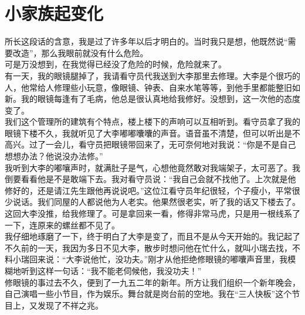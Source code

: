 \fancyhead[RO]{} %
\fancyhead[LE]{} %
\chapter*{小家族起变化}
\thispagestyle{empty}
所长这段话的含意，我是过了许多年以后才明白的。当时我只是想，他既然说“需要改造”，那么我眼前就没有什么危险。\\

可是万没想到，在我觉得已经没了危险的时候，危险就来了。\\

有一天，我的眼镜腿掉了，我请看守员代我送到大李那里去修理。大李是个很巧的人，他常给人修理些小玩意，像眼镜、钟表、自来水笔等等，到他手里都能整旧如新。我的眼镜每逢有了毛病，他总是很认真地给我修好。没想到，这一次他的态度变了。\\

我们这个管理所的建筑有个特点，楼上楼下的声响可以互相听到。看守员拿了我的眼镜下楼不久，我就听见了大李嘟嘟囔囔的声音。语音虽不清楚，但可以听出是不高兴。过了一会儿，看守员把眼镜带回来了，无可奈何地对我说：“你是不是自己想想办法？他说没办法修。”\\

我听到大李的嘟嚷声时，就满肚子是气，心想他竟然敢对我端架子，太可恶了。我倒要看看他是不是敢端下去。我对看守员说：“我自己会就不找他了。上次就是他修好的，还是请江先生跟他再说说吧。”这位江看守员年纪很轻，个子瘦小，平常很少说话。我们同屋的人都说他为人老实。他果然很老实，听了我的话又下楼去了。\\

这回大李没推，给我修理了。可是拿回来一看，修得非常马虎，只是用一根线系了一下，连原来的螺丝都不见了。\\

我仔细地琢磨了一下，终于明白了大李是变了，而且不是从今天开始的。我记起了不久前的一天，我因为多日不见大李，散步时想问他在忙什么，就叫小瑞去找，不料小瑞回来说：“大李说他忙，没功夫。”刚才从他拒绝修眼镜的嘟囔声音里，我模糊地听到这样一句话：“我不能老伺候他，我没功夫！”\\

修眼镜的事过去不久，便到了一九五二年的新年。所方让我们组织一个新年晚会，自己演唱一些小节目，作为娱乐。舞台就是岗台前的空地。我在“三人快板”这个节目上，又发现了不祥之兆。\\

